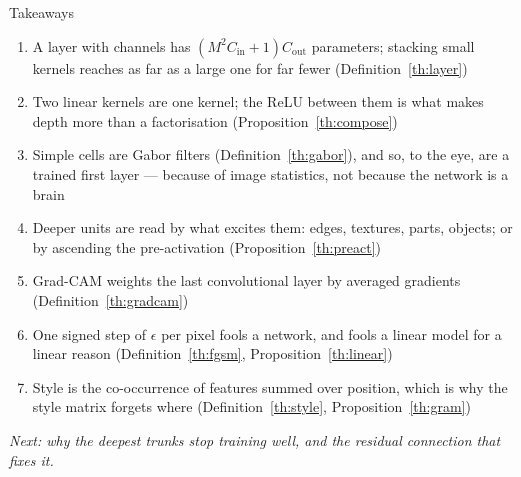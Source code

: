 \documentclass[aspectratio=169, 11pt]{beamer}
\newcommand{\bridge}[1]{%
  {\scriptsize\itshape\color{mcMuted} #1\par}\vspace{0.35em}}
\newcommand{\nosrc}{}       %
\begin{document}
\begin{frame}{Takeaways}
  \nosrc
  \vspace{-0.1em}
  {\scriptsize
  \begin{enumerate}\itemsep0.22em
    \item A layer with channels has $(M^2 C_{\mathrm{in}} + 1) C_{\mathrm{out}}$
          parameters; stacking small kernels reaches as far as a large
          one for far fewer (Definition~\ref{th:layer})
    \item Two linear kernels are one kernel; the ReLU between them is
          what makes depth more than a factorisation
          (Proposition~\ref{th:compose})
    \item Simple cells are Gabor filters (Definition~\ref{th:gabor}),
          and so, to the eye, are a trained first layer --- because of
          image statistics, not because the network is a brain
    \item Deeper units are read by what excites them: edges, textures,
          parts, objects; or by ascending the pre-activation
          (Proposition~\ref{th:preact})
    \item Grad-CAM weights the last convolutional layer by averaged
          gradients (Definition~\ref{th:gradcam})
    \item One signed step of $\epsilon$ per pixel fools a network, and
          fools a linear model for a linear reason
          (Definition~\ref{th:fgsm}, Proposition~\ref{th:linear})
    \item Style is the co-occurrence of features summed over position,
          which is why the style matrix forgets where
          (Definition~\ref{th:style}, Proposition~\ref{th:gram})
  \end{enumerate}}
  \vspace{-0.2em}
  \bridge{Next: why the deepest trunks stop training well, and the
  residual connection that fixes it.}
\end{frame}
\end{document}
